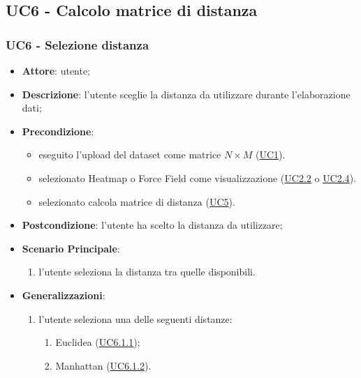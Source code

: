\subsection{UC6 - Calcolo matrice di distanza}
\label{uc6}
    
    \subsubsection{UC6 - Selezione distanza}
    \label{uc6}
    \begin{itemize}
    \item \textbf{Attore}: utente;
    \item \textbf{Descrizione}: l'utente sceglie la distanza da utilizzare durante l'elaborazione dati;
    \item \textbf{Precondizione}: 
    \begin{itemize}
        \item eseguito l'upload del dataset come matrice $N\times M$ (\hyperref[uc1]{UC1}).
        \item selezionato Heatmap o Force Field come visualizzazione (\hyperref[uc2.2]{UC2.2} o \hyperref[uc2.4]{UC2.4}).
        \item selezionato calcola matrice di distanza (\hyperref[uc5]{UC5}).
    \end{itemize}  
    \item \textbf{Postcondizione}: l'utente ha scelto la distanza da utilizzare;
    \item \textbf{Scenario Principale}: 
    \begin{enumerate}
        \item l'utente seleziona la distanza tra quelle disponibili.
    \end{enumerate}
    \item \textbf{Generalizzazioni}:
        \begin{enumerate}
            \item l'utente seleziona una delle seguenti distanze:
                \begin{enumerate}
                    \item Euclidea (\hyperref[uc6.1.1]{UC6.1.1});
                    \item Manhattan (\hyperref[uc6.1.2]{UC6.1.2}).
                \end{enumerate}
        \end{enumerate}  
    \end{itemize}
    
